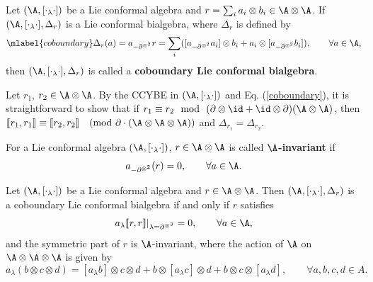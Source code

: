 \documentclass[12pt]{amsart}
\begin{document}
\begin{definition}
    \cite{L}
    Let $(\A, [\cdot_\lambda \cdot])$ be a Lie conformal algebra and $r=\sum_i a_i\otimes b_i\in \A\otimes \A$. If $(\A, [\cdot_\lambda \cdot], \Delta_r)$ is a Lie conformal bialgebra, where $\Delta_r$ is defined by
    \begin{eqnarray}\mlabel{coboundary}
        \Delta_r(a)=a_{-\partial^{\otimes^2}} r=\sum_i ([a_{-\partial^{\otimes^2}} a_i]\otimes b_i+a_i\otimes [a_{-\partial^{\otimes^2}} b_i]),\qquad\forall a\in \A,
    \end{eqnarray}
    then  $(\A,[\cdot_\lambda\cdot],\Delta_r)$ is called a {\bf coboundary Lie conformal bialgebra}.
\end{definition}
\begin{remark}\label{rmk-11}
Let $r_1$, $r_2\in \A\otimes \A$. By the CCYBE in
$(\A,[\cdot_\lambda\cdot])$ and Eq. (\ref{coboundary}), it is
straightforward to show that if $r_1\equiv
r_2~~\text{mod}~~(\partial\otimes \id+\id\otimes
\partial)(\A\otimes \A)$, then $[\![r_1,r_1]\!]\equiv[\![r_2,r_2]\!]\quad
(\mathrm{mod}~\partial\cdot(\A\otimes \A\otimes \A))$ and
$\Delta_{r_1}=\Delta_{r_2}$.
\end{remark}

 For a Lie conformal algebra $(\A, [\cdot_\lambda \cdot])$,   $r\in \A\otimes
 \A$ is called {\bf $\A$-invariant} if
    \begin{equation*}
        a_{-\partial^{\otimes^2}}(r)=0,\qquad \forall a\in \A.
    \end{equation*}




\begin{proposition}\cite[Theorem 3.4]{L}\label{prop-cob}
    Let $(\A, [\cdot_\lambda \cdot])$ be a Lie conformal algebra and $r\in \A\otimes \A$. Then $(\A, [\cdot_\lambda \cdot], \Delta_r)$ is a coboundary Lie conformal bialgebra if and only if
    $r$ satisfies
    $$a_\lambda [\![r,r]\!]|_{\lambda=\partial^{\otimes^3}}=0,\qquad\forall a\in \A,$$
    and
    the symmetric part of $r$ is {$\A$-invariant}, where  the action of $\A$  on $\A\otimes \A\otimes \A$  is given by
    $$
    a_\lambda (b\otimes c\otimes d)=[a_\lambda b]\otimes c\otimes d +b\otimes [a_\lambda c]\otimes d+b\otimes c\otimes [a_\lambda d],
    \qquad \forall a,b,c,d\in A.
    $$

\end{proposition}
\end{document}
